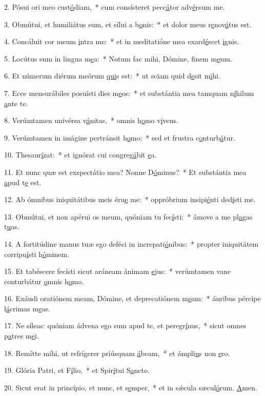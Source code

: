 2. Pósui ori meo cust\uline{ó}diam,~* cum consísteret pecc\uline{á}tor adv\uline{é}rsum me.\par 
3. Obmútui, et humiliátus sum, et sílui a b\uline{o}nis:~* et dolor meus r\uline{e}nov\uline{á}tus est.\par 
4. Concáluit cor meum \uline{i}ntra me:~* et in meditatióne mea exard\uline{é}scet \uline{i}gnis.\par 
5. Locútus sum in lingua m\uline{e}a:~* Notum fac mihi, Dómine, f\uline{i}nem m\uline{e}um.\par 
6. Et númerum diérum meórum \uline{qui}s est:~* ut sciam quid d\uline{e}sit m\uline{i}hi.\par 
7. Ecce mensurábiles posuísti dies m\uline{e}os:~* et substántia mea tamquam n\uline{í}hilum \uline{a}nte te.\par 
8. Verúmtamen univérsa v\uline{á}nitas,~* omnis h\uline{o}mo v\uline{i}vens.\par 
9. Verúmtamen in imágine pertránsit h\uline{o}mo:~* sed et frustra c\uline{o}nturb\uline{á}tur.\par 
10. Thesaur\uline{í}zat:~* et ignórat cui congreg\uline{á}bit \uline{e}a.\par 
11. Et nunc quæ est exspectátio mea? Nonne D\uline{ó}minus?~* Et substántia mea \uline{a}pud t\uline{e} est.\par 
12. Ab ómnibus iniquitátibus meis éru\uline{e} me:~* oppróbrium insipi\uline{é}nti ded\uline{í}sti me.\par 
13. Obmútui, et non apérui os meum, quóniam tu fec\uline{í}sti:~* ámove a me pl\uline{a}gas t\uline{u}as.\par 
14. A fortitúdine manus tuæ ego deféci in increpati\uline{ó}nibus:~* propter iniquitátem corripu\uline{í}sti h\uline{ó}minem.\par 
15. Et tabéscere fecísti sicut aráneam ánimam \uline{e}jus:~* verúmtamen vane conturbátur \uline{o}mnis h\uline{o}mo.\par 
16. Exáudi oratiónem meam, Dómine, et deprecatiónem m\uline{e}am:~* áuribus pércipe l\uline{á}crimas m\uline{e}as.\par 
17. Ne síleas: quóniam ádvena ego sum apud te, et peregr\uline{í}nus,~* sicut omnes p\uline{a}tres m\uline{e}i.\par 
18. Remítte mihi, ut refrígerer priúsquam \uline{á}beam,~* et ámpli\uline{u}s non \uline{e}ro.\par 
19. Glória Patri, et F\uline{í}lio,~* et Spir\uline{í}tui S\uline{a}ncto.\par 
20. Sicut erat in princípio, et nunc, et s\uline{e}mper,~* et in sǽcula sæcul\uline{ó}rum. \uline{A}men.\par 
